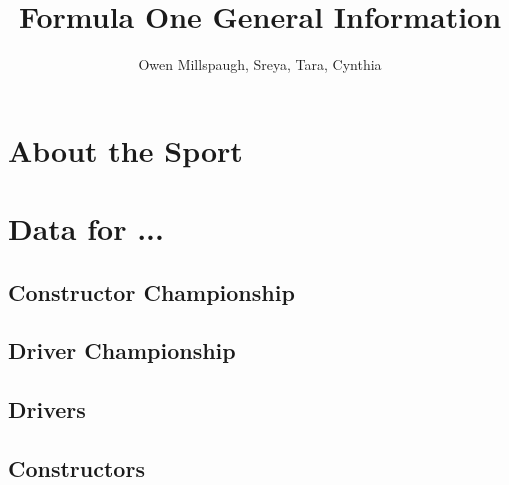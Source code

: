 \documentclass[12pt]{article}
\title{Formula One General Information}
\author{Owen Millspaugh, Sreya, Tara, Cynthia}
\begin{document}
\maketitle

\section{About the Sport}
\subsection{}

\section{Data for ...}
\subsection{Constructor Championship}

\subsection{Driver Championship}

\subsection{Drivers}

\subsection{Constructors}
\end{document}
